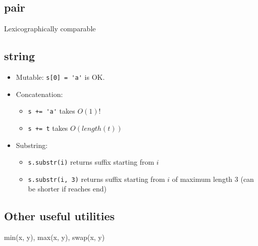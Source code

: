   \subsection{pair}
  \par Lexicographically comparable

  \subsection{string}
  \begin{itemize}
    \item Mutable: \lstinline{s[0] = 'a'} is OK.
    \item Concatenation:
      \begin{itemize}
        \item \lstinline{s += 'a'} takes $O(1)$!
        \item \lstinline{s += t} takes $O(length(t))$
      \end{itemize}
    \item Substring:
      \begin{itemize}
        \item \lstinline{s.substr(i)} returns suffix starting from $i$
        \item \lstinline{s.substr(i, 3)} returns suffix starting from $i$ of maximum length $3$ (can be shorter if reaches end)
      \end{itemize}
    \end{itemize}
  \subsection{Other useful utilities}
  \par min(x, y), max(x, y), swap(x, y)